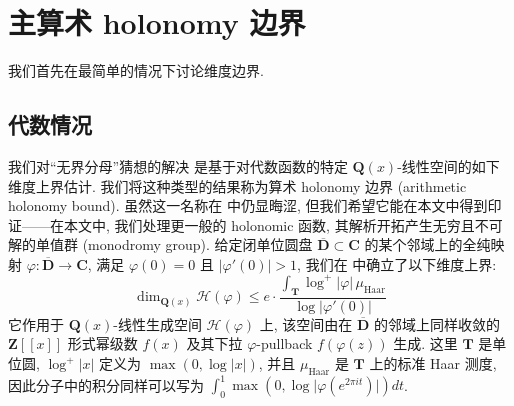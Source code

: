 \section{主算术 holonomy 边界}\label{sec:2}

我们首先在最简单的情况下讨论维度边界.

\subsection{代数情况}\label{sec:2.1}

我们对``无界分母''猜想的解决 \cite{CDT21} 是基于对代数函数的特定 $\mathbf{Q}(x)$-线性空间的如下维度上界估计.
我们将这种类型的结果称为算术 holonomy 边界 (arithmetic holonomy bound).
虽然这一名称在 \cite{CDT21} 中仍显晦涩, 但我们希望它能在本文中得到印证——在本文中, 我们处理更一般的 holonomic 函数, 其解析开拓产生无穷且不可解的单值群 (monodromy group).
给定闭单位圆盘 $\overline{\mathbf{D}} \subset \mathbf{C}$ 的某个邻域上的全纯映射 $\varphi: \overline{\mathbf{D}} \to \mathbf{C}$, 满足 $\varphi(0) = 0$ 且 $\lvert\varphi'(0)\rvert > 1$, 我们在 \cite[Theorem 2.1]{CDT21} 中确立了以下维度上界:
\begin{equation}\label{eq:2.1.1}
\dim_{\mathbf{Q}(x)} \mathcal{H}(\varphi) \le e \cdot \frac{\int_{\mathbf{T}} \log^{+} \lvert\varphi\rvert \, \mu_{\text{Haar}}}{\log \lvert\varphi'(0)\rvert}
\end{equation}
它作用于 $\mathbf{Q}(x)$-线性生成空间 $\mathcal{H}(\varphi)$ 上, 该空间由在 $\overline{\mathbf{D}}$ 的邻域上同样收敛的 $\mathbf{Z}[\! [x]\!]$ 形式幂级数 $f(x)$ 及其下拉 $\varphi$-pullback $f(\varphi(z))$ 生成.
这里 $\mathbf{T}$ 是单位圆, $\log^+\lvert x\rvert$ 定义为 $\max(0, \log\lvert x\rvert)$, 并且 $\mu_{\text{Haar}}$ 是 $\mathbf{T}$ 上的标准 Haar 测度, 
因此分子中的积分同样可以写为 $\int_0^1 \max(0, \log\lvert\varphi(e^{2\pi it})\rvert) dt$.

